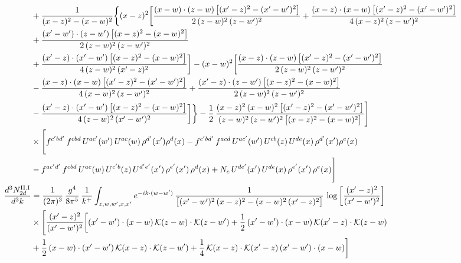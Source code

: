 \documentclass[9pt]{article}
\numberwithin{equation}{section}
\begin{document}
\begin{align}
&+\frac{1}{(x-z)^{2}-(x-w)^{2}}\bigg\{(x-z)^{2}\bigg[\frac{(x-w)\cdot(z-w)\,\big[(x^{\prime}-z)^{2}-(x^{\prime}-w^{\prime})^{2}\big]}{2\,(z-w)^{2}\,(z-w^{\prime})^{2}}+\frac{(x-z)\cdot(x-w)\,\big[(x^{\prime}-z)^{2}-(x^{\prime}-w^{\prime})^{2}\big]}{4\,(x-z)^{2}\,(z-w^{\prime})^{2}}\notag\\ &+\frac{(x^{\prime}-w^{\prime})\cdot(z-w^{\prime})\,\big[(x-z)^{2}-(x-w)^{2}\big]}{2\,(z-w)^{2}\,(z-w^{\prime})^{2}}\notag \\ & +\frac{(x^{\prime}-z)\cdot(x^{\prime}-w^{\prime})\,\big[(x-z)^{2}-(x-w)^{2}\big]}{4\,(z-w)^{2}\,(x^{\prime}-z)^{2}}\bigg]-(x-w)^{2}\bigg[\frac{(x-z)\cdot(z-w)\,\big[(x^{\prime}-z)^{2}-(x^{\prime}-w^{\prime})^{2}\big]}{2\,(z-w)^{2}\,(z-w^{\prime})^{2}}\notag \\ & -\frac{(x-z)\cdot(x-w)\,\big[(x^{\prime}-z)^{2}-(x^{\prime}-w^{\prime})^{2}\big]}{4\,(x-w)^{2}\,(z-w^{\prime})^{2}}+\frac{(x^{\prime}-z)\cdot(z-w^{\prime})\,\big[(x-z)^{2}-(x-w)^{2}\big]}{2\,(z-w)^{2}\,(z-w^{\prime})^{2}}\notag \\ & -\frac{(x^{\prime}-z)\cdot(x^{\prime}-w^{\prime})\,\big[(x-z)^{2}-(x-w)^{2}\big]}{4\,(z-w)^{2}\,(x^{\prime}-w^{\prime})^{2}}\bigg]\bigg\}-\frac{1}{2}\,\frac{(x-z)^{2}\,(x-w)^{2}\,\big[(x^{\prime}-z)^{2}-(x^{\prime}-w^{\prime})^{2}\big]}{(z-w)^{2}\,(z-w^{\prime})^{2}\,\big[(x-z)^{2}-(x-w)^{2}\big]}\Bigg]\notag\\
&\times\Bigg[f^{c^{\prime}bd^{\prime}}\,f^{cbd}\, U^{ac^{\prime}}(w^{\prime})\,U^{ac}(w)\,\rho^{d^{\prime}}(x^{\prime})\rho^{d}(x)- f^{c^{\prime}bd^{\prime}}\,f^{acd}\,U^{ac^{\prime}}(w^{\prime})\,U^{cb}(z)\,U^{de}(x)\,\rho^{d^{\prime}}(x^{\prime})\rho^{e}(x) \notag \\ & -f^{ac^{\prime}d^{\prime}}\,f^{cbd}\,U^{ac}(w)\,U^{c^{\prime}b}(z)\,U^{d^{\prime}e^{\prime}}(x^{\prime})\,\rho^{e^{\prime}}(x^{\prime})\,\rho^{d}(x) +N_{c}\,U^{de^{\prime}}(x^{\prime})\,U^{de}(x)\,\rho^{e^{\prime}}(x^{\prime})\,\rho^{e}(x)\Bigg]\label{eq:B-II2c}\\
\frac{d^{3}N^{\rm II.I}_{2d}}{d^{3}k}&= \frac{1}{(2\pi)^{3}}\,\frac{g^{4}}{8\pi^{5}}\,\frac{1}{k^{+}}\int_{z,w,w^{\prime},x,x^{\prime}}e^{-ik\cdot(w-w^{\prime})}\,\frac{1}{\big[(x^{\prime}-w^{\prime})^{2}\,(x-z)^{2}-(x-w)^{2}\,(x^{\prime}-z)^{2}\big]}\,\log\left[\frac{(x^{\prime}-z)^{2}}{(x^{\prime}-w^{\prime})^{2}}\right]\notag\\
&\times\Bigg[\frac{(x^{\prime}-z)^{2}}{(x^{\prime}-w^{\prime})^{2}}\bigg[(x^{\prime}-w^{\prime})\cdot(x-w)\,\mathcal{K}(z-w)\cdot\mathcal{K}(z-w^{\prime})+\frac{1}{2}\,(x^{\prime}-w^{\prime})\cdot(x-w)\,\mathcal{K}(x^{\prime}-z)\cdot\mathcal{K}(z-w)\notag \\ & +\frac{1}{2}\,(x-w)\cdot(x^{\prime}-w^{\prime})\,\mathcal{K}(x-z)\cdot\mathcal{K}(z-w^{\prime})+\frac{1}{4}\,\mathcal{K}(x-z)\cdot\mathcal{K}(x^{\prime}-z)\,(x^{\prime}-w^{\prime})\cdot(x-w)\bigg]\notag\\

\end{align}
\end{document}

